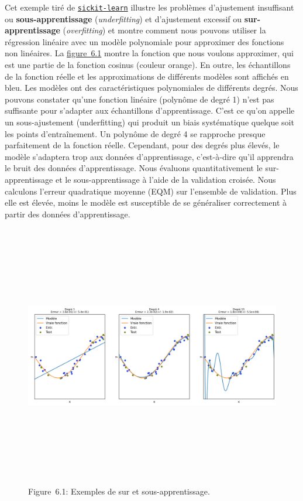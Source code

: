 \documentclass[
]{article}
\begin{document}
Cet exemple tiré de
\href{https://scikit-learn.org/stable/auto_examples/model_selection/plot_underfitting_overfitting.html\#sphx-glr-auto-examples-model-selection-plot-underfitting-overfitting-py}{\texttt{sickit-learn}}
illustre les problèmes d'ajustement insuffisant ou
\textbf{sous-apprentissage} (\emph{underfitting}) et d'ajustement
excessif ou \textbf{sur-apprentissage} (\emph{overfitting}) et montre
comment nous pouvons utiliser la régression linéaire avec un modèle
polynomiale pour approximer des fonctions non linéaires. La
\hyperref[fig-overfitting]{figure~{6.1}} montre la fonction que nous
voulons approximer, qui est une partie de la fonction cosinus (couleur
orange). En outre, les échantillons de la fonction réelle et les
approximations de différents modèles sont affichés en bleu. Les modèles
ont des caractéristiques polynomiales de différents degrés. Nous pouvons
constater qu'une fonction linéaire (polynôme de degré 1) n'est pas
suffisante pour s'adapter aux échantillons d'apprentissage. C'est ce
qu'on appelle un sous-ajustement (underfitting) qui produit un biais
systématique quelque soit les points d'entraînement. Un polynôme de
degré 4 se rapproche presque parfaitement de la fonction réelle.
Cependant, pour des degrés plus élevés, le modèle s'adaptera trop aux
données d'apprentissage, c'est-à-dire qu'il apprendra le bruit des
données d'apprentissage. Nous évaluons quantitativement le
sur-apprentissage et le sous-apprentissage à l'aide de la validation
croisée. Nous calculons l'erreur quadratique moyenne (EQM) sur
l'ensemble de validation. Plus elle est élevée, moins le modèle est
susceptible de se généraliser correctement à partir des données
d'apprentissage.

\label{cell-fig-overfitting}
\label{fig-overfitting}
\begin{figure}
\centering
\includegraphics[width=11.23958in,height=4.53125in]{05-ClassificationsSupervisees_files/figure-html/fig-overfitting-output-1.png}
\caption{Figure~6.1: Exemples de sur et sous-apprentissage.}
\end{figure}
\end{document}

